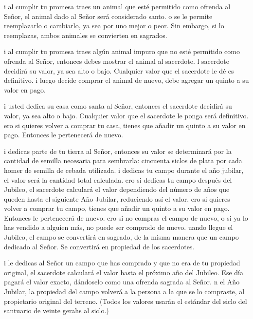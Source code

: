  i al cumplir tu promesa traes un animal que esté permitido
como ofrenda al Señor, el animal dado al Señor será considerado santo.
 o se le permite reemplazarlo o cambiarlo, ya sea por uno
mejor o peor. Sin embargo, si lo reemplazas, ambos animales se
convierten en sagrados.

 i al cumplir tu promesa traes algún animal impuro que no
esté permitido como ofrenda al Señor, entonces debes mostrar el animal
al sacerdote.  l sacerdote decidirá su valor, ya sea alto o
bajo. Cualquier valor que el sacerdote le dé es definitivo.
 i luego decide comprar el animal de nuevo, debe agregar un
quinto a su valor en pago.

 i usted dedica su casa como santa al Señor, entonces el
sacerdote decidirá su valor, ya sea alto o bajo. Cualquier valor que el
sacerdote le ponga será definitivo.  ero si quieres volver
a comprar tu casa, tienes que añadir un quinto a su valor en pago.
Entonces le pertenecerá de nuevo.

 i dedicas parte de tu tierra al Señor, entonces su valor
se determinará por la cantidad de semilla necesaria para sembrarla:
cincuenta siclos de plata por cada homer de semilla de cebada utilizada.
 i dedicas tu campo durante el año jubilar, el valor será
la cantidad total calculada.  ero si dedicas tu campo
después del Jubileo, el sacerdote calculará el valor dependiendo del
número de años que queden hasta el siguiente Año Jubilar, reduciendo así
el valor.  ero si quieres volver a comprar tu campo, tienes
que añadir un quinto a su valor en pago. Entonces le pertenecerá de
nuevo.  ero si no compras el campo de nuevo, o si ya lo has
vendido a alguien más, no puede ser comprado de nuevo. 
uando llegue el Jubileo, el campo se convertirá en sagrado, de la misma
manera que un campo dedicado al Señor. Se convertirá en propiedad de los
sacerdotes.

 i le dedicas al Señor un campo que has comprado y que no
era de tu propiedad original,  el sacerdote calculará el
valor hasta el próximo año del Jubileo. Ese día pagará el valor exacto,
dándoselo como una ofrenda sagrada al Señor.  n el Año
Jubilar, la propiedad del campo volverá a la persona a la que se lo
compraste, al propietario original del terreno.  (Todos los
valores usarán el estándar del siclo del santuario de veinte gerahs al
siclo.)

